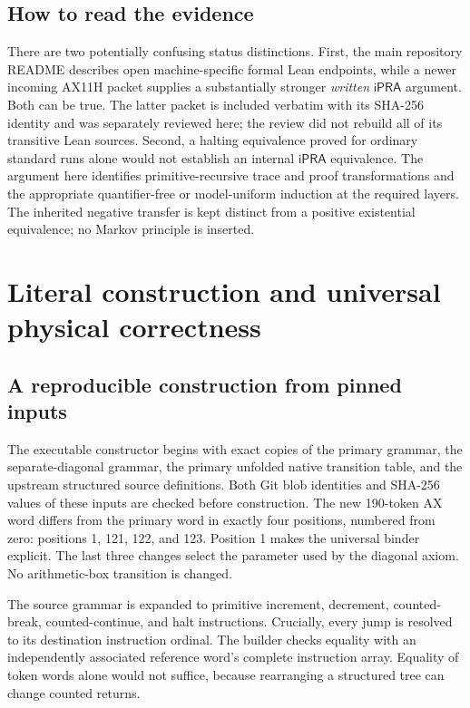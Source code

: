 \documentclass[11pt,letterpaper]{article}
\theoremstyle{definition}
\newcommand{\ipra}{\mathsf{iPRA}}
\begin{document}
\subsection{How to read the evidence}
There are two potentially confusing status distinctions.
First, the main repository README describes open machine-specific formal
Lean endpoints, while a newer incoming AX11H packet supplies a substantially
stronger \emph{written} $\ipra$ argument. Both can be true. The latter
packet is included verbatim with its SHA-256 identity and was separately
reviewed here; the review did not rebuild all of its transitive Lean
sources. Second, a halting equivalence proved for ordinary standard runs
alone would not establish an internal $\ipra$ equivalence. The argument
here identifies primitive-recursive trace and proof transformations and the
appropriate quantifier-free or model-uniform induction at the required
layers. The inherited negative transfer is kept distinct from a positive
existential equivalence; no Markov principle is inserted.





\section{Literal construction and universal physical correctness}
\label{sec:physical}
\subsection{A reproducible construction from pinned inputs}
The executable constructor begins with exact copies of the primary grammar,
the separate-diagonal grammar, the primary unfolded native transition table,
and the upstream structured source definitions. Both Git blob identities
and SHA-256 values of these inputs are checked before construction. The new
190-token AX word differs from the primary word in exactly four positions,
numbered from zero: positions 1, 121, 122, and 123. Position 1 makes the
universal binder explicit. The last three changes select the parameter
used by the diagonal axiom. No arithmetic-box transition is changed.

The source grammar is expanded to primitive increment, decrement,
counted-break, counted-continue, and halt instructions. Crucially, every
jump is resolved to its destination instruction ordinal. The builder
checks equality with an independently associated reference word's complete
instruction array. Equality of token words alone would not suffice,
because rearranging a structured tree can change counted returns.
\end{document}
